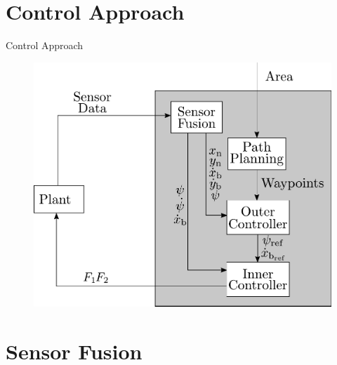 \section{Control Approach}

\begin{frame}{Control Approach}{}
    \begin{figure}[H]
        \centering
        \includegraphics[width=.6\linewidth]{figures/controllerDiagram2}
    \end{figure}
\end{frame}

\section{Sensor Fusion}

